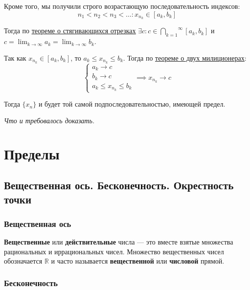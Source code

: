 \documentclass[a4paper,12pt,oneside]{extbook}
\newcommand{\newpar}{$ $\par\nobreak\ignorespaces}
\theoremstyle{numbered}
\theoremstyle{unnumbered}
\theoremstyle{named}
\theoremstyle{unnumbered}
\theoremstyle{named}
\theoremstyle{named}
\theoremstyle{named}
\renewenvironment{proof}[1][]{\breakenv[Доказательство]{\if\relax\detokenize{#1}\relax\else\;\fi}{\textbf{#1}}}{\smallskip\newpar \hfill\textit{Что и требовалось доказать.}}
\newcommand{\plink}[2]{\hyperref[#1]{\color{blue}\underline{#2}}}
\begin{document}
\begin{proof}
    Кроме того, мы получили строго возрастающую последовательность индексов:
    \[
        n_1 < n_2 < n_3 < \ldots : x_{n_k} \in [a_k, b_k]
    \]

    Тогда по \plink{sec:Теорема Коши-Кантора о стягивающихся отрезках}{теореме о стягивающихся отрезках} \(\exists c: c \in \overset{\infty}{\underset{k = 1}{\bigcap}} [a_k, b_k]\) и \(\displaystyle c = \lim_{k \rightarrow \infty}{a_k} = \lim_{k \rightarrow \infty}{b_k}\).

    Так как \(x_{n_k} \in [a_k, b_k]\), то \(a_k \leq x_{n_k} \leq b_k\). Тогда по \plink{sub:Теорема о двух милиционерах}{теореме о двух милиционерах}:
    \[
        \begin{cases}
            a_k \rightarrow c \\
            b_k \rightarrow c \\
            a_k \leq x_{n_k} \leq b_k
        \end{cases}
        \implies
        x_{n_k} \rightarrow c
    \]

    Тогда \(\{x_n\}\) и будет той самой подпоследовательностью, имеющей предел.
\end{proof}

\chapter{Пределы}%
\label{cha:Пределы}

\section{Вещественная ось. Бесконечность. Окрестность точки}%
\label{sec:Вещественная ось. Бесконечность. Окрестность точки}

\subsection{Вещественная ось}%
\label{sub:Вещественная ось}

\begin{siderules}
    \textbf{Вещественные} или \textbf{действительные} числа — это вместе взятые множества рациональных и иррациональных чисел. Множество вещественных чисел обозначается \(\mathbb{R}\) и часто называется \textbf{вещественной} или \textbf{числовой} прямой.
\end{siderules}


\subsection{Бесконечность}%
\label{sub:Бесконечность}
\end{document}
